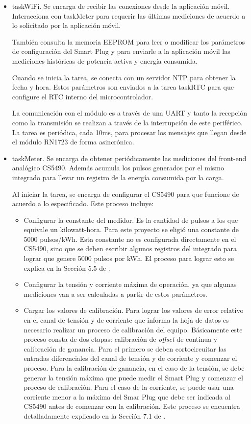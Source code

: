 \begin{itemize}
\item taskWiFi. Se encarga de recibir las conexiones desde la aplicación móvil. Interacciona con taskMeter para requerir las últimas mediciones de acuerdo a lo solicitado por la aplicación móvil.

También consulta la memoria EEPROM para leer o modificar los parámetros de configuración del Smart Plug y para enviarle a la aplicación móvil las mediciones históricas de potencia activa y energía consumida.

Cuando se inicia la tarea, se conecta con un servidor NTP para obtener la fecha y hora. Estos parámetros son enviados a la tarea taskRTC para que configure el RTC interno del microcontrolador.

La comunicación con el módulo es a través de una UART y tanto la recepción como la transmisión se realizan a través de la interrupción de este periférico. La tarea es periódica, cada 10ms, para procesar los mensajes que llegan desde el módulo RN1723  de forma asincrónica.

\item taskMeter. Se encarga de obtener periódicamente las mediciones del front-end analógico CS5490. Además acumula los pulsos generados por el mismo integrado para llevar un registro de la energía consumida por la carga.

Al iniciar la tarea, se encarga de configurar el CS5490 para que funcione de acuerdo a lo especificado. Este proceso incluye:

\begin{itemize}
\item Configurar la constante del medidor. Es la cantidad de pulsos a los que equivale un kilowatt-hora. Para este proyecto se eligió una constante de 5000 pulsos/kWh. Esta constante no es configurada directamente en el CS5490, sino que se deben escribir algunos registros del integrado para lograr que genere 5000 pulsos por kWh. El proceso para lograr esto se explica en la Sección 5.5 de \citep{datasheet_CS5490}.
\item Configurar la tensión y corriente máxima de operación, ya que algunas mediciones van a ser calculadas a partir de estos parámetros.
\item Cargar los valores de calibración. Para lograr los valores de error relativo en el canal de tensión y de corriente que informa la hoja de datos es necesario realizar un proceso de calibración del equipo. Básicamente este proceso consta de dos etapas: calibración de \textit{offset} de continua y calibración de ganancia. Para el primero se deben cortocircuitar las entradas diferenciales del canal de tensión y de corriente y comenzar el proceso. Para la calibración de ganancia, en el caso de la tensión, se debe generar la tensión máxima que puede medir el Smart Plug y comenzar el proceso de calibración. Para el caso de la corriente, se puede usar una corriente menor a la máxima del Smar Plug que debe ser indicada al CS5490 antes de comenzar con la calibración.
Este proceso se encuentra detalladamente explicado en la Sección 7.1 de \citep{datasheet_CS5490}.


\end{itemize}
\end{itemize}
